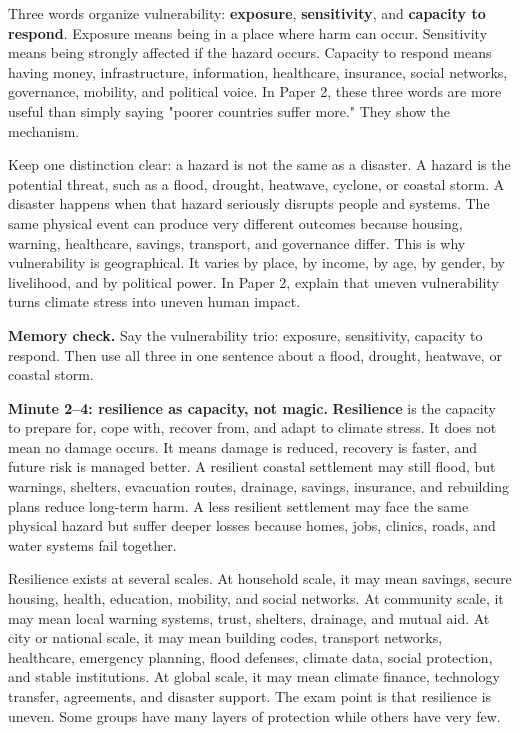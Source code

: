 \documentclass[11pt,a4paper]{article}
\newcommand{\term}[1]{\textcolor{HeadingBlue}{\textbf{#1}}}
\begin{document}
Three words organize vulnerability: \term{exposure}, \term{sensitivity}, and
\term{capacity to respond}. Exposure means being in a place where harm can
occur. Sensitivity means being strongly affected if the hazard occurs.
Capacity to respond means having money, infrastructure, information,
healthcare, insurance, social networks, governance, mobility, and political
voice. In Paper 2, these three words are more useful than simply saying
"poorer countries suffer more." They show the mechanism.

Keep one distinction clear: a hazard is not the same as a disaster. A hazard is
the potential threat, such as a flood, drought, heatwave, cyclone, or coastal
storm. A disaster happens when that hazard seriously disrupts people and
systems. The same physical event can produce very different outcomes because
housing, warning, healthcare, savings, transport, and governance differ. This
is why vulnerability is geographical. It varies by place, by income, by age, by
gender, by livelihood, and by political power. In Paper 2, explain that uneven
vulnerability turns climate stress into uneven human impact.

\textbf{Memory check.} Say the vulnerability trio: exposure, sensitivity,
capacity to respond. Then use all three in one sentence about a flood, drought,
heatwave, or coastal storm.

\textbf{Minute 2--4: resilience as capacity, not magic.}
\term{Resilience} is the capacity to prepare for, cope with, recover from, and
adapt to climate stress. It does not mean no damage occurs. It means damage is
reduced, recovery is faster, and future risk is managed better. A resilient
coastal settlement may still flood, but warnings, shelters, evacuation routes,
drainage, savings, insurance, and rebuilding plans reduce long-term harm. A
less resilient settlement may face the same physical hazard but suffer deeper
losses because homes, jobs, clinics, roads, and water systems fail together.

Resilience exists at several scales. At household scale, it may mean savings,
secure housing, health, education, mobility, and social networks. At community
scale, it may mean local warning systems, trust, shelters, drainage, and mutual
aid. At city or national scale, it may mean building codes, transport networks,
healthcare, emergency planning, flood defenses, climate data, social protection,
and stable institutions. At global scale, it may mean climate finance,
technology transfer, agreements, and disaster support. The exam point is that
resilience is uneven. Some groups have many layers of protection while others
have very few.
\end{document}
